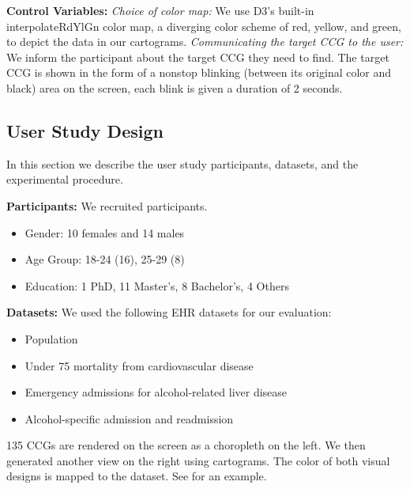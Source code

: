 \documentclass[Afour,sagev,times]{sagej}
\newcommand{\bobgraph}[1]{\noindent\textbf{#1}}
\begin{document}
\bobgraph{Control Variables: }\textit{Choice of color map:} We use D3's built-in interpolateRdYlGn color map, a diverging color scheme of red, yellow, and green, to depict the data in our cartograms. \textit{Communicating the target CCG to the user:} We inform the participant about the target CCG they need to find. The target CCG is shown in the form of a nonstop blinking (between its original color and black) area on the screen, each blink is given a duration of 2 seconds.

\subsection{User Study Design}\label{subsec:{User Study Design}}

In this section we describe the user study participants, datasets, and the experimental procedure.

\bobgraph{Participants:} We recruited \pCount participants.

\begin{itemize}
    \setlength\itemsep{0px}
    \item Gender: 10 females and 14 males
    \item Age Group: 18-24 (16), 25-29 (8)
    \item Education: 1 PhD, 11 Master's, 8 Bachelor's, 4 Others
\end{itemize}

\bobgraph{Datasets:} We used the following EHR datasets for our evaluation:

\begin{itemize}
    \setlength\itemsep{0px}
    \item Population
    \item Under 75 mortality from cardiovascular disease
    \item Emergency admissions for alcohol-related liver disease
    \item Alcohol-specific admission and readmission
\end{itemize}

135 CCGs are rendered on the screen as a choropleth on the left. We then generated another view on the right using cartograms. The color of both visual designs is mapped to the dataset. See  for an example.
\end{document}
